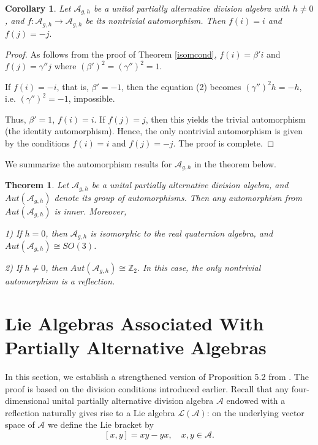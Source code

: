 \documentclass{amsart}
\theoremstyle{definition}
\theoremstyle{plain}
\newtheorem{theorem}{Theorem}
\newtheorem{corollary}{Corollary}
\begin{document}
\begin{corollary}
Let  $\mathcal A_{g, h}$ be a unital partially alternative division algebra with $h\neq 0$, and $f: \mathcal A_{g, h}\to \mathcal A_{g, h}$ be its nontrivial automorphism.
Then $f(i)=i$ and $f(j)=-j.$
\end{corollary}

\begin{proof} As follows from the proof of Theorem \ref{isomcond}, $f(i) = \beta' i$ and $f(j)= \gamma'' j$ where $(\beta')^2 = (\gamma'')^2 = 1.$ 

If $f(i)=-i$, that is, $\beta'=-1$, then 
the equation (2) becomes $ (\gamma'')^2 h = -h$, i.e. $(\gamma'')^2 = -1$, impossible.

Thus, $\beta'=1$, $f(i)=i$. If $f(j)=j$, then this yields the trivial automorphism (the identity automorphism). Hence, the only nontrivial automorphism is given by the conditions  
$f(i)= i$ and $f(j)= -j$. The proof is complete.
\end{proof}

We summarize the automorphism results for $\mathcal A_{g, h}$ in the theorem below.

\begin{theorem} \label{PAaut}
Let $\mathcal A_{g, h}$ be a unital partially alternative division algebra, and $Aut(\mathcal A_{g, h})$ denote its group of automorphisms. Then any automorphism from 
$Aut(\mathcal A_{g, h})$ is inner. Moreover, 

1) If $h=0$, then $\mathcal A_{g, h}$ is isomorphic to the real quaternion algebra, and  $Aut(\mathcal A_{g, h})\cong SO(3)$.

2) If $h\neq 0$, then $Aut(\mathcal A_{g, h}) \cong \mathbb Z_2.$ In this case, the only nontrivial automorphism is a reflection.

\end{theorem}

 

\section{Lie Algebras Associated With  Partially Alternative Algebras}

In this section, we establish a strengthened version of Proposition 5.2 from \cite{HNT}. The proof is based on the division conditions introduced earlier. Recall that any four-dimensional unital partially alternative division algebra $\mathcal{A}$ endowed with a reflection naturally gives rise to a Lie algebra $\mathcal{L}(\mathcal{A})$: on the underlying vector space of $\mathcal{A}$ we define the Lie bracket by
$$ [x, y] = xy - yx, \quad x, y\in \mathcal A. $$
\end{document}

